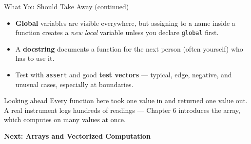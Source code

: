\documentclass[9pt,aspectratio=169,xcolor=table]{beamer}
\begin{document}
\begin{frame}{What You Should Take Away (continued)}
    \leavevmode
    \small
    \begin{itemize}
        \item \textbf{Global} variables are visible everywhere, but
              assigning to a name inside a function creates a
              \emph{new local} variable unless you declare
              \texttt{global} first.
        \item A \textbf{docstring} documents a function for the next
              person (often yourself) who has to use it.
        \item Test with \texttt{assert} and good \textbf{test vectors}
              --- typical, edge, negative, and unusual cases, especially
              at boundaries.
    \end{itemize}

    \vspace{3mm}
    \begin{alertblock}{Looking ahead}
        Every function here took one value in and returned one value
        out. A real instrument logs hundreds of readings --- Chapter 6
        introduces the \alert{array}, which computes on many values at
        once.
    \end{alertblock}

    \vspace{3mm}
    \begin{center}
        \large\color{primary}\textbf{Next: Arrays and Vectorized Computation}
    \end{center}
\end{frame}
\end{document}
